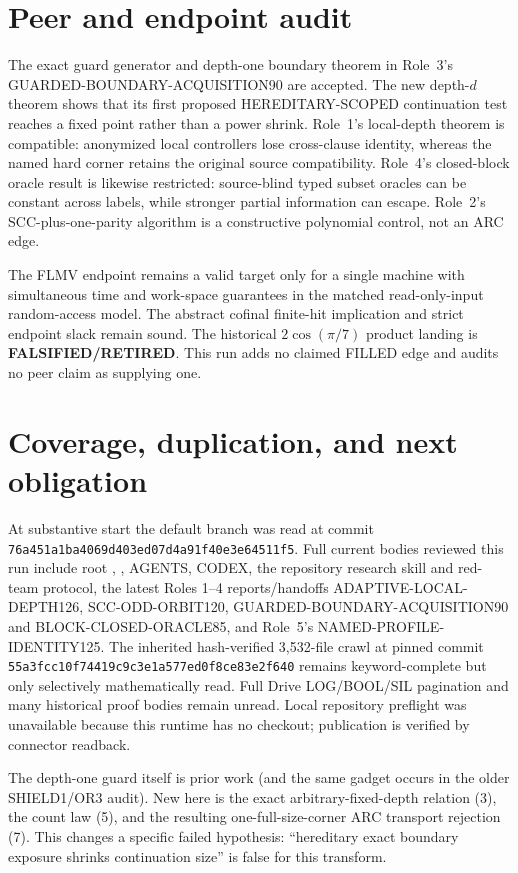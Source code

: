 \documentclass[11pt]{article}
\begin{document}
\section{Peer and endpoint audit}
The exact guard generator and depth-one boundary theorem in Role~3's
GUARDED-BOUNDARY-ACQUISITION90 are accepted.  The new depth-$d$ theorem
shows that its first proposed HEREDITARY-SCOPED continuation test reaches a
fixed point rather than a power shrink.  Role~1's local-depth theorem is
compatible: anonymized local controllers lose cross-clause identity,
whereas the named hard corner retains the original source compatibility.
Role~4's closed-block oracle result is likewise restricted: source-blind
typed subset oracles can be constant across labels, while stronger partial
information can escape.  Role~2's SCC-plus-one-parity algorithm is a
constructive polynomial control, not an ARC edge.

The FLMV endpoint remains a valid target only for a single machine with
simultaneous time and work-space guarantees in the matched read-only-input
random-access model.  The abstract cofinal finite-hit implication and
strict endpoint slack remain sound.  The historical
$2\cos(\pi/7)$ product landing is \textbf{FALSIFIED/RETIRED}.  This run
adds no claimed FILLED edge and audits no peer claim as supplying one.

\section{Coverage, duplication, and next obligation}
At substantive start the default branch was read at commit
\texttt{76a451a1ba4069d403ed07d4a91f40e3e64511f5}.  Full current bodies
reviewed this run include root , , AGENTS,
CODEX, the repository research skill and red-team protocol, the latest
Roles 1--4 reports/handoffs ADAPTIVE-LOCAL-DEPTH126,
SCC-ODD-ORBIT120, GUARDED-BOUNDARY-ACQUISITION90 and
BLOCK-CLOSED-ORACLE85, and Role~5's NAMED-PROFILE-IDENTITY125.  The
inherited hash-verified 3,532-file crawl at pinned commit
\texttt{55a3fcc10f74419c9c3e1a577ed0f8ce83e2f640} remains keyword-complete
but only selectively mathematically read.  Full Drive LOG/BOOL/SIL
pagination and many historical proof bodies remain unread.  Local
repository preflight was unavailable because this runtime has no checkout;
publication is verified by connector readback.

The depth-one guard itself is prior work (and the same gadget occurs in the
older SHIELD1/OR3 audit).  New here is the exact arbitrary-fixed-depth
relation (3), the count law (5), and the resulting one-full-size-corner ARC
transport rejection (7).  This changes a specific failed hypothesis:
``hereditary exact boundary exposure shrinks continuation size'' is false
for this transform.
\end{document}

